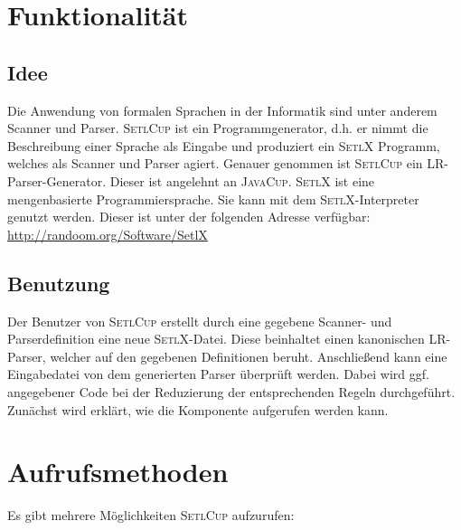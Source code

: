 \section{Funktionalität}
\subsection{Idee}
Die Anwendung von formalen Sprachen in der Informatik sind unter anderem Scanner und Parser\cite{Aho86}\cite{stroetmann:formallanguages}. \textsc{SetlCup} ist ein Programmgenerator, d.h. er nimmt die Beschreibung einer Sprache als Eingabe und produziert ein \textsc{SetlX} Programm, welches als Scanner und Parser agiert. Genauer genommen ist \textsc{SetlCup} ein LR-Parser-Generator. Dieser ist angelehnt an \textsc{JavaCup}\cite{javacup:2016}.
\textsc{SetlX} ist eine mengenbasierte Programmiersprache. Sie kann mit dem \textsc{SetlX}-Interpreter genutzt werden. Dieser ist unter der folgenden Adresse verfügbar:\\
\href{http://randoom.org/Software/SetlX}{{http://randoom.org/Software/SetlX}}
\subsection{Benutzung}
Der Benutzer von \textsc{SetlCup} erstellt durch eine gegebene Scanner- und Parserdefinition eine neue \textsc{SetlX}-Datei. Diese beinhaltet einen kanonischen LR-Parser, welcher auf den gegebenen Definitionen beruht. Anschließend kann eine Eingabedatei von dem generierten Parser überprüft werden. Dabei wird ggf. angegebener Code bei der Reduzierung der entsprechenden Regeln durchgeführt. 
Zunächst wird erklärt, wie die Komponente aufgerufen werden kann.
\section{Aufrufsmethoden}
Es gibt mehrere Möglichkeiten \textsc{SetlCup} aufzurufen:
